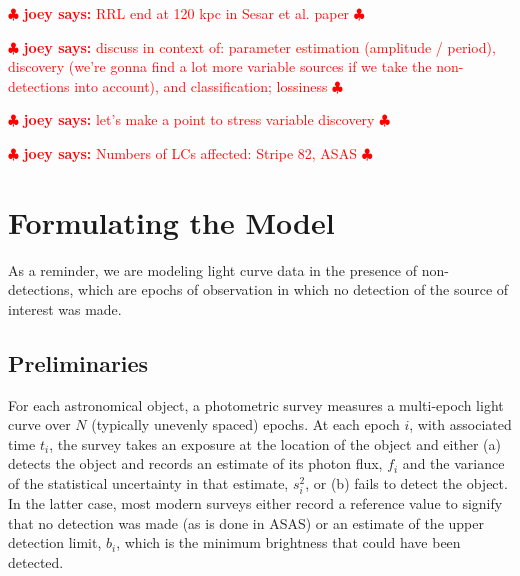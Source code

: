 \documentclass[12pt,preprint]{aastex}
\newcommand{\fobs}{f_i}
\newcommand{\sobs}{s^2_i}
\newcommand{\joey}[1] { \textcolor{red} {
\ensuremath{\clubsuit} {\bf joey says:}  {#1}
\ensuremath{\clubsuit} } }%
\begin{document}
\joey{RRL end at 120 kpc in Sesar et al. paper}

\joey{discuss in context of: parameter estimation (amplitude / period), discovery (we're gonna find a lot more variable sources if we take the non-detections into account), and classification; lossiness}

\joey{let's make a point to stress variable discovery}

\joey{Numbers of LCs affected: Stripe 82, ASAS}




\section{Formulating the Model}
\label{sec:model}


As a reminder, we are modeling light curve data in the presence of non-detections, which are epochs of observation in which no detection of the source of interest was made.

\subsection{Preliminaries}
\label{ss:prelim}

For each astronomical object, a photometric survey measures a multi-epoch light curve over $N$ (typically unevenly spaced) epochs.  At each epoch $i$, with associated time $t_i$, the survey takes an exposure at the location of the object and either (a) detects the object and records an estimate of its photon flux, $\fobs$ and the  variance of the statistical uncertainty in that estimate, $\sobs$, or (b) fails to detect the object.  In the latter case, most modern surveys either record a reference value to signify that no detection was made (as is done in ASAS) or an estimate of the upper detection limit, $b_i$, which is the minimum brightness that could have been detected.
\end{document}
